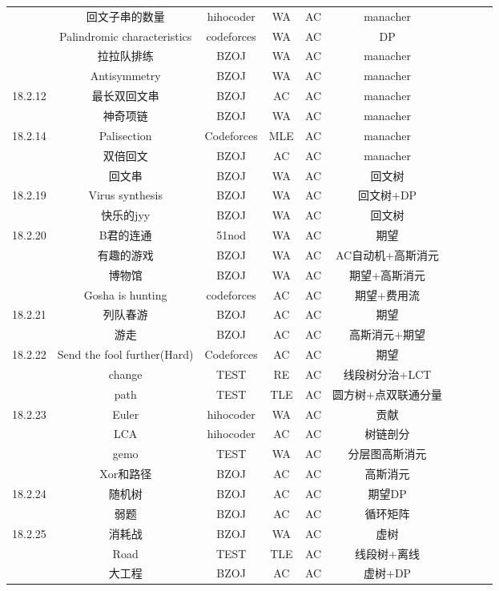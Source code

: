 \documentclass[landscape]{article}
\begin{document}
\begin{longtable}{cccccccccc}
  & 回文子串的数量 & hihocoder & WA & AC & manacher\\
  & Palindromic characteristics & codeforces & WA & AC & DP\\
  & 拉拉队排练 & BZOJ & WA & AC & manacher\\
  & Antisymmetry & BZOJ & WA & AC & manacher\\
  \hline
  18.2.12 & 最长双回文串 & BZOJ & AC & AC & manacher\\
  & 神奇项链 & BZOJ & WA & AC & manacher\\
  \hline
  18.2.14 & Palisection & Codeforces & MLE & AC & manacher\\
  & 双倍回文 & BZOJ & AC & AC & manacher\\
  & 回文串 & BZOJ & WA & AC & 回文树\\
  \hline
  18.2.19 & Virus synthesis & BZOJ & WA & AC & 回文树+DP\\
  & 快乐的jyy & BZOJ & WA & AC & 回文树\\
  \hline
  18.2.20 & B君的连通 & 51nod & WA & AC & 期望\\
  & 有趣的游戏 & BZOJ & WA & AC & AC自动机+高斯消元\\
  & 博物馆 & BZOJ & WA & AC & 期望+高斯消元\\
  & Gosha is hunting & codeforces & AC & AC & 期望+费用流\\
  \hline
  18.2.21 & 列队春游 & BZOJ & AC & AC & 期望\\
  & 游走 & BZOJ & AC & AC & 高斯消元+期望\\
  \hline
  18.2.22 & Send the fool further(Hard) & Codeforces & AC & AC & 期望\\
  & change & TEST & RE & AC & 线段树分治+LCT\\
  & path & TEST & TLE & AC & 圆方树+点双联通分量\\
  \hline
  18.2.23 & Euler & hihocoder & WA & AC & 贡献\\
  & LCA & hihocoder & AC & AC & 树链剖分\\
  & gemo & TEST & WA & AC & 分层图高斯消元\\
  & Xor和路径 & BZOJ & AC & AC & 高斯消元\\
  \hline
  18.2.24 & 随机树 & BZOJ & AC & AC & 期望DP\\
  & 弱题 & BZOJ & AC & AC & 循环矩阵\\
  \hline
  18.2.25 & 消耗战 & BZOJ & WA & AC & 虚树\\
  & Road & TEST & TLE & AC & 线段树+离线\\
  & 大工程 & BZOJ & AC & AC & 虚树+DP\\

\end{longtable}
\end{document}
